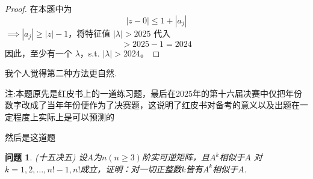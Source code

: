 \documentclass[12pt]{ctexart}  %
\newtheorem{question}{问题}[]
\begin{document}
\begin{proof}
在本题中为
\[
|z - 0| \leq 1 + |a_j|
\]
$\implies |a_j| \geq |z| - 1$，将特征值 $|\lambda| > 2025$ 代入
\[
> 2025 - 1 = 2024
\]
因此，至少有一个 $\lambda$，s.t. $|\lambda| > 2024$。


\end{proof}
我个人觉得第二种方法更自然.

注:本题原先是红皮书上的一道练习题，最后在2025年的第十六届决赛中仅把年份数字改成了当年年份便作为了决赛题，这说明了红皮书对备考的意义以及出题在一定程度上实际上是可以预测的
\vspace{1em}

然后是这道题
\\
\begin{question}(十五决五)
设$A$为$n(n \geq 3)$阶实可逆矩阵，且$A^k$相似于$A$
对$k = 1,2,\dots,n!-1,n!$成立，证明：对一切正整数$k$皆有$A^k$相似于$A$.
\end{question}
\end{document}

